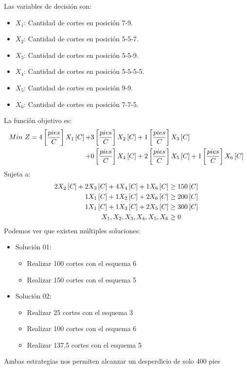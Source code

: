 \documentclass{tarea}
\begin{document}
\begin{homeworkProblem}
Las variables de decisión son:
\begin{itemize}
	\item $X_1$: Cantidad de cortes en posición 7-9.
	\item $X_2$: Cantidad de cortes en posición 5-5-7.
	\item $X_3$: Cantidad de cortes en posición 5-5-9.
	\item $X_4$: Cantidad de cortes en posición 5-5-5-5.
	\item $X_5$: Cantidad de cortes en posición 9-9.
	\item $X_6$: Cantidad de cortes en posición 7-7-5.
\end{itemize}
La función objetivo es: 
\begin{align*}
	Min\ Z = 4\left[ \frac{pies}{C} \right]X_1\left[ C \right] + &3\left[ \frac{pies}{C} \right]X_2\left[ C \right] + 1\left[ \frac{pies}{C} \right]X_3\left[ C \right] \\ + &0\left[ \frac{pies}{C} \right]X_4\left[ C \right] + 2\left[ \frac{pies}{C} \right]X_5\left[ C \right] +1\left[ \frac{pies}{C} \right]X_6\left[ C \right]
\end{align*}
Sujeta a:
\begin{align*}
	2X_2\left[ C \right] +2X_3\left[ C \right] +4X_4\left[ C \right] + 1X_6\left[ C \right] &\ge 150\left[ C \right] \\
	1X_1\left[ C \right] + 1X_2\left[ C \right] + 2X_6\left[ C \right] &\ge 200\left[ C \right] \\
	1X_1\left[ C \right] + 1X_3\left[ C \right] + 2X_5\left[ C \right] &\ge 300\left[ C \right] \\
	X_1,X_2,X_3,X_4,X_5, X_6 &\ge 0
\end{align*}
Podemos ver que existen múltiples soluciones:
\begin{itemize}
	\item Solución 01:
	\begin{itemize}
		\item Realizar 100 cortes con el esquema 6
		\item Realizar 150 cortes con el esquema 5
	\end{itemize}
	\item Solución 02:
	\begin{itemize}
		\item Realizar 25 cortes con el esquema 3
		\item Realizar 100 cortes con el esquema 6
		\item Realizar 137,5 cortes con el esquema 5
	\end{itemize}
\end{itemize}
Ambas estrategias nos permiten alcanzar un desperdicio de solo 400 pies
\end{homeworkProblem}
\end{document}
